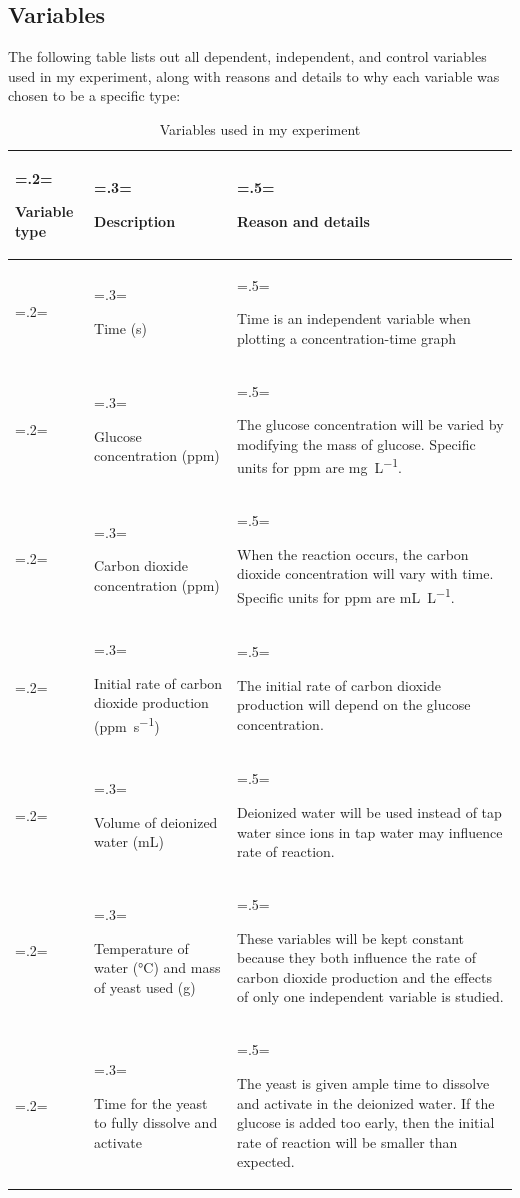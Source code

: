 \documentclass{article}
\begin{document}
\subsection{Variables}
The following table lists out all dependent, independent, and control variables used in my experiment, along with reasons and details to why each variable was chosen to be a specific type:
\begin{table}[H]
\centering
\caption{Variables used in my experiment}
\label{table:2}
\begin{tabularx}{\textwidth} {
    | >{\hsize=.2\hsize \linewidth=\hsize \raggedright\arraybackslash}X
    | >{\hsize=.3\hsize \linewidth=\hsize \raggedright\arraybackslash}X
    | >{\hsize=.5\hsize \linewidth=\hsize \raggedright\arraybackslash}X |}
    \hline
    \rowcolor[HTML]{CCCCCC} Variable type & Description & Reason and details \\
    \hline
    \multirow[t]{2}{\hsize}{Independent} & Time (\si{s}) & Time is an independent variable when plotting a concentration-time graph \\
    \cline{2-3}
    & Glucose concentration (\si{ppm}) & The glucose concentration will be varied by modifying the mass of glucose. Specific units for ppm are \si{mg.L^{-1}}. \\
    \hline
    \multirow[t]{2}{\hsize}{Dependent} & Carbon dioxide concentration (\si{ppm}) & When the reaction occurs, the carbon dioxide concentration will vary with time. Specific units for ppm are \si{mL.L^{-1}}. \\
    \cline{2-3}
    & Initial rate of carbon dioxide production (\si{ppm.s^{-1}}) & The initial rate of carbon dioxide production will depend on the glucose concentration. \\
    \hline
    \multirow[t]{3}{\hsize}{Control} & Volume of deionized water (\si{mL}) & Deionized water will be used instead of tap water since ions in tap water may influence rate of reaction. \\
    \cline{2-3}
    & Temperature of water (\si{\celsius}) and mass of yeast used (\si{g}) & These variables will be kept constant because they both influence the rate of carbon dioxide production and the effects of only one independent variable is studied. \\
    \cline{2-3}
    & Time for the yeast to fully dissolve and activate & The yeast is given ample time to dissolve and activate in the deionized water. If the glucose is added too early, then the initial rate of reaction will be smaller than expected. \\
    \hline
\end{tabularx}
\end{table}
\end{document}
